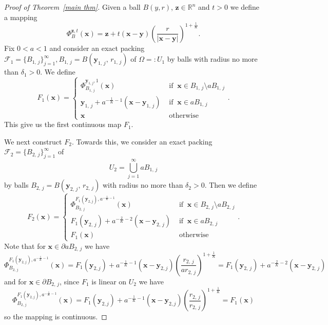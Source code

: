 \documentclass[reqno,11pt]{amsart}
\numberwithin{equation}{section}
\theoremstyle{remark}
\begin{document}
\begin{proof}[Proof of Theorem~\ref{main thm}]
Given a ball $B(y,r)$, $\mathbf z\in \mathbb R^n$ and $t>0$ we define a mapping
$$\Phi_{B}^{\mathbf z,t}(\mathbf x)=\mathbf z+ t(\mathbf x-\mathbf y)\left(\frac{r}{|\mathbf x-\mathbf y|}\right)^{1+\frac 1 K}.$$
 Fix $0<a<1$ and consider an exact packing $\mathcal F_1=\{B_{1,\,j}\}_{j=1}^\infty, B_{1,\,j}=B(\mathbf {y}_{1,\,j},\,r_{1,\,j})$ of $\Omega=:U_1$ by balls  with radius no more than $\delta_1>0$. We define 
$$
F_1(\mathbf {x}) = \left\{ \begin{array}{ll}
\Phi^{\mathbf{y}_{1,j},1}_{B_{1,\,j}}(\mathbf {x}) & \textrm{ if } \ \mathbf x\in B_{1,\,j}\setminus a B_{1,\,j}\\
\mathbf {y}_{1,\,j}+a^{-\frac 1 K-1}(\mathbf x-\mathbf {y}_{1,\,j}) & \textrm{ if } \ \mathbf  x\in aB_{1,\,j}\\
\mathbf {x}  & \textrm{ otherwise }
\end{array} \right. .$$
This give us the first continuous map $F_1$.

We next construct $F_2$. Towards this, we consider  an exact packing $\mathcal F_2=\{B_{2,\,j}\}_{j=1}^\infty$ of 
$$U_2=\bigcup_{j=1}^\infty aB_{1,\,j}$$
by balls $B_{2,\,j}=B(\mathbf {y}_{2,\,j},\,r_{2,\,j})$ with radius no more than $\delta_2>0$.
Then we define
$$
F_2(\mathbf {x}) = \left\{ \begin{array}{ll}
\Phi^{F_1(\mathbf y_{2,j}),a^{-\frac{1}{K}-1}}_{B_{2,\,j}}(\mathbf {x}) & \textrm{ if } \ \mathbf x\in B_{2,\,j}\setminus a B_{2,\,j}\\
F_1(\mathbf {y}_{2,\,j})+a^{-\frac 2 K-2}(\mathbf x-\mathbf {y}_{2,\,j}) & \textrm{ if } \  \mathbf x\in aB_{2,\,j}\\
F_1(\mathbf x) & \textrm{ otherwise }
\end{array} \right. .$$
Note that for $\mathbf{x}\in \partial a B_{2,\,j}$ we have
$$
\Phi^{F_1(\mathbf{y}_{2,j}),a^{-\frac{1}{K}-1}}_{B_{2,\,j}}(\mathbf {x})=
F_1(\mathbf{y}_{2,j})+a^{-\frac{1}{K}-1} (\mathbf{x}-\mathbf{y}_{2,j})
\left(\frac{r_{2,\,j}}{ar_{2,\,j}}\right)^{1+\frac 1 K}=F_1(\mathbf {y}_{2,\,j})+a^{-\frac 2 K-2}(\mathbf x-\mathbf {y}_{2,\,j})
$$
and for $\mathbf{x}\in \partial B_{2,\,j}$, since $F_1$ is linear on $U_2$ we have
$$
\Phi^{F_1(\mathbf{y}_{2,j}),a^{-\frac{1}{K}-1}}_{B_{2,\,j}}(\mathbf {x})=
F_1(\mathbf{y}_{2,j})+a^{-\frac{1}{K}-1} (\mathbf{x}-\mathbf{y}_{2,j})
\left(\frac{r_{2,\,j}}{r_{2,\,j}}\right)^{1+\frac 1 K}= F_1(\mathbf{x})
$$
so the mapping is continuous.


\end{proof}
\end{document}
